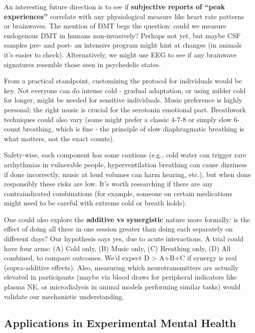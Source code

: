\documentclass[11pt]{article}
\newcommand{\quotes}[1]{``#1''}
\begin{document}
An interesting future direction is to see if \textbf{subjective reports of \quotes{peak experiences}} correlate with any physiological measure like heart rate patterns or brainwaves. The mention of DMT begs the question: could we measure endogenous DMT in humans non-invasively? Perhaps not yet, but maybe CSF samples pre- and post- an intensive program might hint at changes (in animals it's easier to check). Alternatively, we might use EEG to see if any brainwave signatures resemble those seen in psychedelic states.

From a practical standpoint, customizing the protocol for individuals would be key. Not everyone can do intense cold - gradual adaptation, or using milder cold for longer, might be needed for sensitive individuals. Music preference is highly personal; the right music is crucial for the serotonin emotional part. Breathwork techniques could also vary (some might prefer a classic 4-7-8 or simply slow 6-count breathing, which is fine - the principle of slow diaphragmatic breathing is what matters, not the exact counts).

Safety-wise, each component has some cautions (e.g., cold water can trigger rare arrhythmias in vulnerable people, hyperventilation breathing can cause dizziness if done incorrectly, music at loud volumes can harm hearing, etc.), but when done responsibly these risks are low. It's worth researching if there are any contraindicated combinations (for example, someone on certain medications might need to be careful with extreme cold or breath holds).

One could also explore the \textbf{additive vs synergistic} nature more formally: is the effect of doing all three in one session greater than doing each separately on different days? Our hypothesis says yes, due to acute interactions. A trial could have four arms: (A) Cold only, (B) Music only, (C) Breathing only, (D) All combined, to compare outcomes. We'd expect D > A+B+C if synergy is real (supra-additive effects). Also, measuring which neurotransmitters are actually elevated in participants (maybe via blood draws for peripheral indicators like plasma NE, or microdialysis in animal models performing similar tasks) would validate our mechanistic understanding.

\subsection{Applications in Experimental Mental Health}
\end{document}
